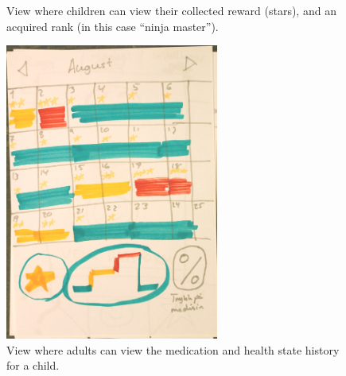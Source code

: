 \begin{figure}
\begin{minipage}[b]{0.46\linewidth}
	\caption[Rewards view from design workshop]{View where children can view their collected reward (stars), and an acquired rank (in this case ``ninja master'').}
	\label{fig:dwChildRewardsView}
	\end{minipage}
\end{figure}

% 

\begin{figure}
	\begin{center}
		\includegraphics[width=7cm]{Pictures/DesignWorkshop/AdultLogView}
		\caption[Log view from design workshop]{View where adults can view the medication and health state history for a child.}
		\label{fig:dwAdultLogView}
	\end{center}
\end{figure}
\clearpage{}
